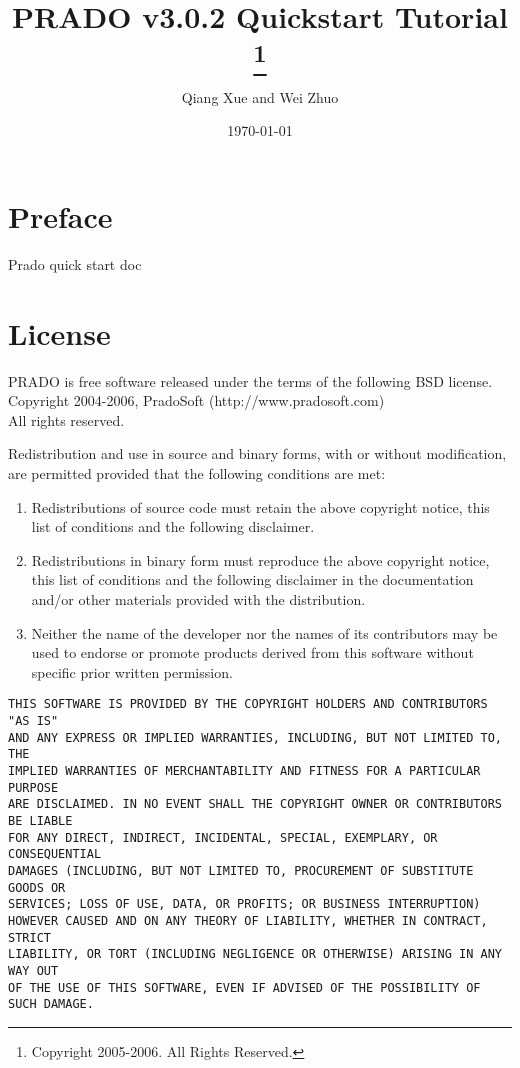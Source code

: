 \documentclass{book}
\title{\Huge \bfseries PRADO v3.0.2 Quickstart Tutorial
    \thanks{Copyright 2005-2006. All Rights Reserved.}
}
\author{Qiang Xue and Wei Zhuo}
\date{\today}
\begin{document}
\maketitle

\pagestyle{plain}
\tableofcontents

\chapter*{Preface}
Prado quick start doc

\chapter*{License}
PRADO is free software released under the terms of the following BSD license.\\
Copyright 2004-2006, PradoSoft (http://www.pradosoft.com)\\
All rights reserved.

Redistribution and use in source and binary forms, with or without
modification, are permitted provided that the following conditions are met:
\begin{enumerate}
	\item Redistributions of source code must retain the above copyright notice,
this list of conditions and the following disclaimer.

 \item Redistributions in binary form must reproduce the above copyright notice,
this list of conditions and the following disclaimer in the documentation
and/or other materials provided with the distribution.

\item Neither the name of the developer nor the names of its contributors may
be used to endorse or promote products derived from this software without
specific prior written permission.
\end{enumerate}

\begin{verbatim}
THIS SOFTWARE IS PROVIDED BY THE COPYRIGHT HOLDERS AND CONTRIBUTORS "AS IS"
AND ANY EXPRESS OR IMPLIED WARRANTIES, INCLUDING, BUT NOT LIMITED TO, THE
IMPLIED WARRANTIES OF MERCHANTABILITY AND FITNESS FOR A PARTICULAR PURPOSE
ARE DISCLAIMED. IN NO EVENT SHALL THE COPYRIGHT OWNER OR CONTRIBUTORS BE LIABLE
FOR ANY DIRECT, INDIRECT, INCIDENTAL, SPECIAL, EXEMPLARY, OR CONSEQUENTIAL
DAMAGES (INCLUDING, BUT NOT LIMITED TO, PROCUREMENT OF SUBSTITUTE GOODS OR
SERVICES; LOSS OF USE, DATA, OR PROFITS; OR BUSINESS INTERRUPTION)
HOWEVER CAUSED AND ON ANY THEORY OF LIABILITY, WHETHER IN CONTRACT, STRICT
LIABILITY, OR TORT (INCLUDING NEGLIGENCE OR OTHERWISE) ARISING IN ANY WAY OUT
OF THE USE OF THIS SOFTWARE, EVEN IF ADVISED OF THE POSSIBILITY OF SUCH DAMAGE.
\end{verbatim}


\newpage

\pagestyle{fancyplain}














\end{document}
